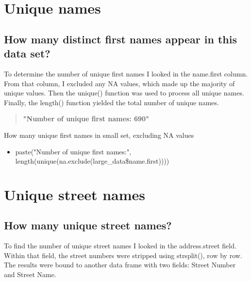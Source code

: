\documentclass[12pt,fleqn]{report} %
\begin{document}
\chapter{Unique names}

\section{How many distinct first names appear in this data set?}\label{unique_names}

To determine the number of unique first names I looked in the name.first column. From that column, I excluded any NA values, which made up the majority of unique values. Then the unique() function was used to process all unique names. Finally, the length() function yielded the total number of unique names. 

\begin{quote}
\textbf{	"Number of unique first names: 690"}
\end{quote}

\begin{remark}
How many unique first names in small set, excluding NA values    \begin{itemize}
    	\item paste("Number of unique first names:", length(unique(na.exclude(large\_data\$name.first))))
    \end{itemize}
\end{remark}




\chapter{Unique street names}
\section{How many unique street names?}

To find the number of unique street names I looked in the address.street field. Within that field, the street numbers were stripped using strsplit(), row by row. The results were bound to another data frame with two fields: Street Number and Street Name. 
\end{document}
